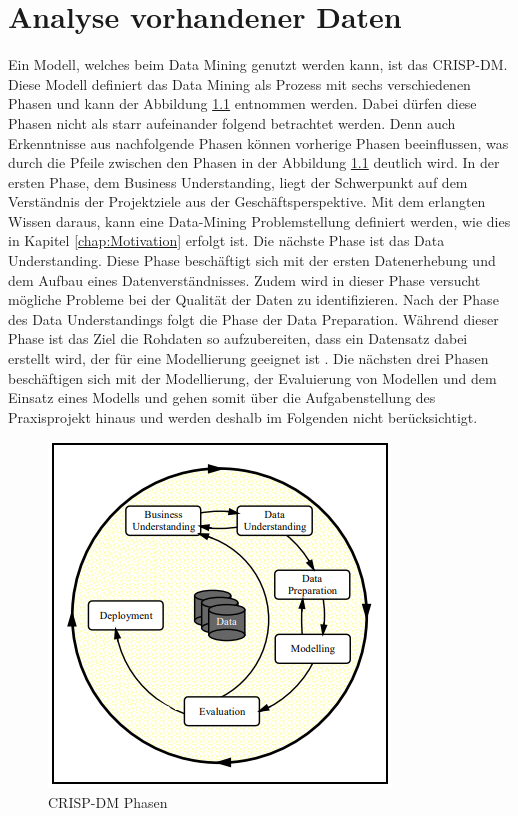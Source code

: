 \chapter{Analyse vorhandener Daten}
\label{chap:kapitel4}

Ein Modell, welches beim Data Mining genutzt werden kann, ist das \ac*{CRISP-DM}. Diese Modell definiert das Data Mining als Prozess mit sechs verschiedenen Phasen und kann der 
Abbildung \ref*{fig:CRISP-DM} entnommen werden. Dabei dürfen diese Phasen nicht als starr aufeinander folgend betrachtet werden. Denn auch Erkenntnisse aus nachfolgende Phasen können vorherige Phasen
beeinflussen, was durch die Pfeile zwischen den Phasen in der Abbildung \ref*{fig:CRISP-DM} deutlich wird. In der ersten Phase, dem Business Understanding, liegt der Schwerpunkt auf dem Verständnis 
der Projektziele aus der Geschäftsperspektive. Mit dem erlangten Wissen daraus, kann eine Data-Mining Problemstellung definiert werden, wie dies in Kapitel \ref*{chap:Motivation} erfolgt ist. 
Die nächste Phase ist das Data Understanding. Diese Phase beschäftigt sich mit der ersten Datenerhebung und dem Aufbau eines Datenverständnisses. Zudem wird in dieser Phase versucht mögliche Probleme 
bei der Qualität der Daten zu identifizieren. Nach der Phase des Data Understandings folgt die Phase der Data Preparation. Während dieser Phase ist das Ziel die Rohdaten so aufzubereiten, dass ein 
Datensatz dabei erstellt wird, der für eine Modellierung geeignet ist \cite[S.5-7]{q8}. Die nächsten drei Phasen beschäftigen sich mit der Modellierung, der Evaluierung von Modellen und dem Einsatz 
eines Modells und gehen somit über die Aufgabenstellung des Praxisprojekt hinaus und werden deshalb im Folgenden nicht berücksichtigt.

\begin{figure}[H]
    \centering
    \includegraphics[]{abbildungen/CrispDM.PNG}
    \caption{\acs{CRISP-DM} Phasen \cite[S.5]{q8}}
    \label{fig:CRISP-DM}
\end{figure}

